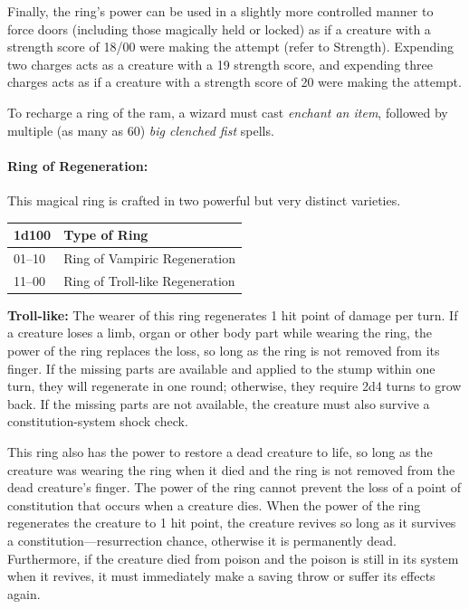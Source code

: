 \begin{multicols}{2}
Finally, the ring's power can be used in a slightly more controlled manner to force doors (including those magically held or locked) as if a creature with a strength score of 18/00 were making the attempt (refer to Strength).  Expending two charges acts as a creature with a 19 strength score, and expending three charges acts as if a creature with a strength score of 20 were making the attempt. 

To recharge a ring of the ram, a wizard must cast \textit{enchant an item}, followed by multiple (as many as 60) \textit{big clenched fist} spells.

\paragraph{Ring of Regeneration:} This magical ring is crafted in two powerful but very distinct varieties.

\noindent
\begin{tabular}{|p{}|p{}|}
\hline
1d100	& Type of Ring \\
\hline\hline
\rowcolor[gray]{.9}01--10	& Ring of Vampiric Regeneration \\
11--00	& Ring of Troll-like Regeneration \\
\hline
\end{tabular}

\textbf{Troll-like:} The wearer of this ring regenerates 1 hit point of damage per turn.  If a creature loses a limb, organ or other body part while wearing the ring, the power of the ring replaces the loss, so long as the ring is not removed from its finger.  If the missing parts are available and applied to the stump within one turn, they will regenerate in one round; otherwise, they require 2d4 turns to grow back.  If the missing parts are not available, the creature must also survive a constitution-system shock check.  

This ring also has the power to restore a dead creature to life, so long as the creature was wearing the ring when it died and the ring is not removed from the dead creature's finger.  The power of the ring cannot prevent the loss of a point of constitution that occurs when a creature dies.  When the power of the ring regenerates the creature to 1 hit point, the creature revives so long as it survives a constitution---resurrection chance, otherwise it is permanently dead.  Furthermore, if the creature died from poison and the poison is still in its system when it revives, it must immediately make a saving throw or suffer its effects again.


\end{multicols}
